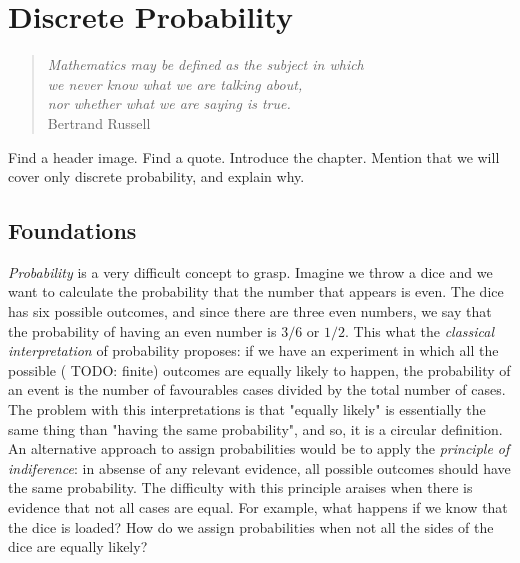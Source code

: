 %
%


\chapter{Discrete Probability}
\label{chap:Probability Theory}

\begin{quote}
\begin{flushright}
\emph{Mathematics may be defined as the subject in which\\
we never know what we are talking about,\\
nor whether what we are saying is true.}\\
Bertrand Russell
\end{flushright}
\end{quote}
\bigskip

{\color{red} Find a header image. Find a quote. Introduce the chapter. Mention that we will cover only discrete probability, and explain why.}

%
%

\section{Foundations}
\label{sec:probability_foundations}

\emph{Probability} is a very difficult concept to grasp. Imagine we throw a dice and we want to calculate the probability that the number that appears is even. The dice has six possible outcomes, and since there are three even numbers, we say that the probability of having an even number is $3/6$ or $1/2$. This what the \emph{classical interpretation} of probability proposes: if we have an experiment in which all the possible {(\color{red} TODO: finite)} outcomes are equally likely to happen, the probability of an event is the number of favourables cases divided by the total number of cases. The problem with this interpretations is that "equally likely" is essentially the same thing than "having the same probability", and so, it is a circular definition. An alternative approach to assign probabilities would be to apply the \emph{principle of indiference}: in absense of any relevant evidence, all possible outcomes should have the same probability. The difficulty with this principle araises when there is evidence that not all cases are equal. For example, what happens if we know that the dice is loaded? How do we assign probabilities when not all the sides of the dice are equally likely?

